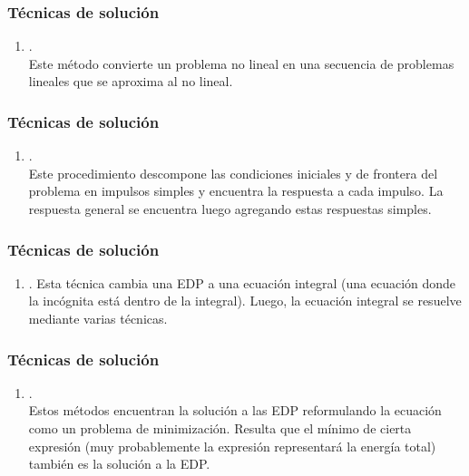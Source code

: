 \documentclass[12pt]{beamer}
\begin{document}
\begin{frame}
\frametitle{Técnicas de solución}
\begin{enumerate}
\conti
\item {}.
\\
\bigskip
Este método convierte un problema no lineal en una secuencia de problemas lineales que se aproxima al no lineal.
\seti
\end{enumerate}
\end{frame}
\begin{frame}
\frametitle{Técnicas de solución}
\begin{enumerate}
\conti
\item {}.
\\
\bigskip
Este procedimiento descompone las condiciones iniciales y de frontera del problema en impulsos simples y encuentra la respuesta a cada impulso. La respuesta general se encuentra luego agregando estas respuestas simples.
\seti
\end{enumerate}
\end{frame}
\begin{frame}
\frametitle{Técnicas de solución}
\begin{enumerate}
\conti
\item {}. Esta técnica cambia una EDP a una ecuación integral (una ecuación donde la incógnita está dentro de la integral). Luego, la ecuación integral se resuelve mediante varias técnicas.
\seti
\end{enumerate}
\end{frame}
\begin{frame}
\frametitle{Técnicas de solución}
\begin{enumerate}
\conti
\item {}.
\\
\bigskip
Estos métodos encuentran la solución a las EDP reformulando la ecuación como un problema de minimización. Resulta que el mínimo de cierta expresión (muy probablemente la expresión representará la energía total) también es la solución a la EDP.
\seti
\end{enumerate}
\end{frame}
\end{document}
